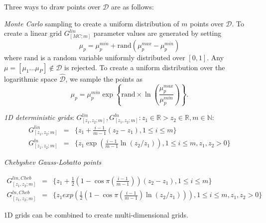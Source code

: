 Three ways to draw points over $\mathcal{D}$ are as follows:

\textit{Monte Carlo} sampling to create a uniform distribution of $m$ points over $\mathcal{D}$. To create a linear grid $G^{lin}_{[MC;m]}$ parameter values are generated by setting
\begin{equation}
\mu_p = \mu_p^{min} + \mbox{rand}(\mu_p^{max}-\mu_p^{min})
\end{equation}
where $\mbox{rand}$ is a random variable uniformly distributed over $[0,1]$. Any $\mu=[\mu_1 \dots \mu_P] \notin \mathcal{D}$ is rejected. To create a uniform distribution over the logarithmic space $\hat{\mathcal{D}}$, we sample the points as 
\begin{equation}
\mu_p = \mu_p^{min} \exp\left\lbrace\mbox{rand}\times\ln\left(\frac{\mu_p^{max}}{\mu_p^{min}}\right)\right\rbrace.
\end{equation}

\textit{1D deterministic grids}: 
$G^{lin}_{[z_1,z_2;m]},G^{ln}_{[z_1,z_2;m]}: z_1 \in \mathbb{R}> z_2 \in \mathbb{R}, m \in \mathbb{N}$:
\begin{equation}\begin{array}{lcl}
G^{lin}_{[z_1,z_2;m]}&=&\lbrace z_1 + \frac{i-1}{m-1}(z_2-z_1), 1\leq i \leq m \rbrace \\
G^{ln}_{[z_1,z_2;m]}&=&\lbrace z_1 \exp \left( \frac{i-1}{m-1} \ln(z_2/z_1) \right) , 1\leq i \leq m, z_1, z_2 >0 \rbrace
\end{array}
\end{equation}

\textit{Chebyshev Gauss-Lobatto points}

\begin{equation}\begin{array}{lcl}
G^{lin, Cheb}_{[z_1,z_2;m]}&=&\lbrace z_1 + \frac{1}{2}\left(1-\cos \pi \left(\frac{i-1}{m-1}\right) \right)(z_2-z_1), 1\leq i \leq m \rbrace \\
G^{ln, Cheb}_{[z_1,z_2;m]}&=&\lbrace z_1 exp \left(\frac{1}{2}\left(1-\cos \pi \left(\frac{i-1}{m-1}\right)\ln(z_2/z_1) \right) \right), 1\leq i \leq m, z_1, z_2 >0 \rbrace
\end{array}
\end{equation}

1D grids can be combined to create multi-dimensional grids.



